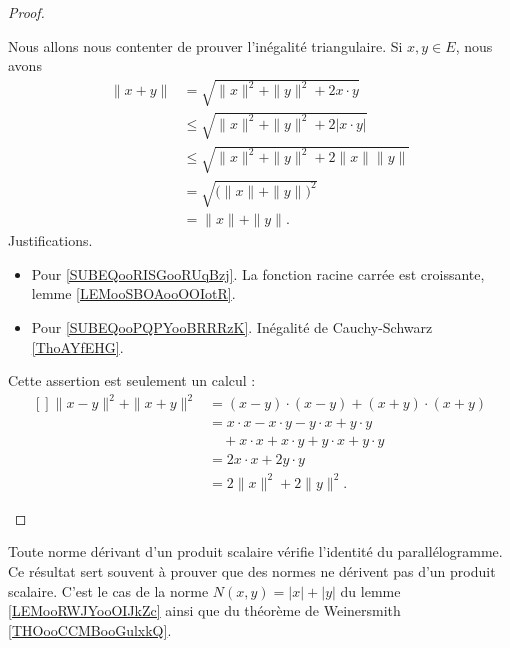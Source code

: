 \begin{proof}
	\begin{subproof}
		Nous allons nous contenter de prouver l'inégalité triangulaire. Si \( x,y\in E\),  nous avons
		\begin{subequations}
			\begin{align}
				\| x+y \| & =\sqrt{ \| x \|^2+\| y \|^2+2x\cdot y }                                            \\
				          & \leq\sqrt{ \| x \|^2+\| y \|^2+2| x\cdot y | } \label{SUBEQooRISGooRUqBzj}         \\
				          & \leq\sqrt{ \| x \|^2+\| y \|^2+2\| x \|\| y \| }       \label{SUBEQooPQPYooBRRRzK} \\
				          & =\sqrt{ \big( \| x \|+\| y \| \big)^2 }                                            \\
				          & =\| x \|+\| y \|.
			\end{align}
		\end{subequations}
		Justifications.
		\begin{itemize}
			\item Pour \eqref{SUBEQooRISGooRUqBzj}. La fonction racine carrée est croissante, lemme \ref{LEMooSBOAooOOIotR}.
			\item Pour \eqref{SUBEQooPQPYooBRRRzK}. Inégalité de Cauchy-Schwarz \ref{ThoAYfEHG}.
		\end{itemize}

		Cette assertion est seulement un calcul :
		\begin{equation}
			\begin{aligned}[]
				\| x-y \|^2+\| x+y \|^2 & =(x-y)\cdot (x-y)+(x+y)\cdot(x+y)          \\
				                        & =x\cdot x-x\cdot y-y\cdot x+y\cdot y       \\
				                        & \quad +x\cdot x+x\cdot y+y\cdot x+y\cdot y \\
				                        & =2x\cdot x+2y\cdot y                       \\
				                        & =2\| x \|^2+2\| y \|^2.
			\end{aligned}
		\end{equation}
	\end{subproof}
\end{proof}

Toute norme dérivant d'un produit scalaire vérifie l'identité du parallélogramme. Ce résultat sert souvent à prouver que des normes ne dérivent pas d'un produit scalaire. C'est le cas de la norme \( N(x,y)=| x |+| y |\) du lemme \ref{LEMooRWJYooOIJkZc} ainsi que du théorème de Weinersmith \ref{THOooCCMBooGulxkQ}.

